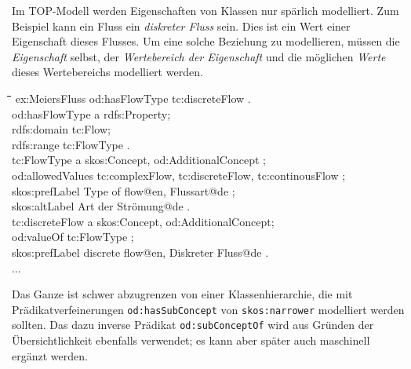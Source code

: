\documentclass[11pt,a4paper]{article}
\newenvironment{code}{\tt \begin{tabbing}
\hskip12pt\=\hskip12pt\=\hskip12pt\=\hskip12pt\=\hskip5cm\=\hskip5cm\=\kill}
{\end{tabbing}}
\def\dq{{\char34}}
\begin{document}
Im TOP-Modell werden Eigenschaften von Klassen nur spärlich modelliert. Zum
Beispiel kann ein Fluss ein \emph{diskreter Fluss} sein. Dies ist ein Wert
einer Eigenschaft dieses Flusses. Um eine solche Beziehung zu modellieren,
müssen die \emph{Eigenschaft} selbst, der \emph{Wertebereich der Eigenschaft}
und die möglichen \emph{Werte} dieses Wertebereichs modelliert werden.

\begin{code}
  ex:MeiersFluss od:hasFlowType tc:discreteFlow . \\[4pt]
  
  od:hasFlowType a rdfs:Property;\\
    \>rdfs:domain tc:Flow;\\
    \>rdfs:range tc:FlowType .\\[4pt]

  tc:FlowType a skos:Concept, od:AdditionalConcept ;\\
    \>od:allowedValues tc:complexFlow, tc:discreteFlow, tc:continousFlow ;\\
    \>skos:prefLabel {\dq}Type of flow{\dq}@en, {\dq}Flussart{\dq}@de ;\\
    \>skos:altLabel {\dq}Art der Strömung{\dq}@de .\\[4pt]
  
  tc:discreteFlow a skos:Concept, od:AdditionalConcept;\\
    \>od:valueOf tc:FlowType ;  \\
    \>skos:prefLabel {\dq}discrete flow{\dq}@en, {\dq}Diskreter Fluss{\dq}@de .\\[4pt] 
  ...  
\end{code}

Das Ganze ist schwer abzugrenzen von einer Klassenhierarchie, die mit
Prädikatverfeinerungen \texttt{od:hasSubConcept} von \texttt{skos:narrower}
modelliert werden sollten.  Das dazu inverse Prädikat \texttt{od:subConceptOf}
wird aus Gründen der Übersichtlichkeit ebenfalls verwendet; es kann aber
später auch maschinell ergänzt werden.
\end{document}
